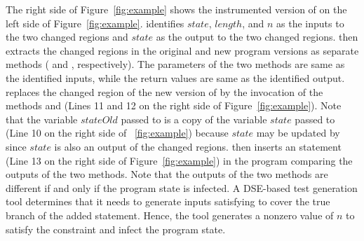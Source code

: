The right side of Figure~\ref{fig:example} shows the instrumented version of  on the left side of 
Figure~\ref{fig:example}. 
 identifies $state$, $length$, and $n$ as the inputs to the two changed regions
and $state$ as the output to the two changed regions.
 then extracts the
changed regions in the original and new program versions as separate methods 
( and , respectively).
The parameters of the two methods are same as the identified inputs, while the return values 
are same as the identified output.
 replaces the changed region of the new version of
 by the invocation of the methods  and  
(Lines 11 and 12 on the right side of Figure~\ref{fig:example}). 
Note that the variable $stateOld$ passed to 
 is a copy of the variable $state$ passed to  (Line 10 on the right side of ~\ref{fig:example}) because 
$state$ may be updated by  since $state$ is also an output of the changed regions. 
 then inserts an  statement (Line 13 on the right side of Figure~\ref{fig:example})
in the program comparing the outputs of the two methods.
Note that the outputs of the two methods are different if and only if the program state is infected.
A DSE-based test generation tool determines that it needs to generate inputs 
satisfying  to cover the true branch of the added  statement. 
Hence, the tool generates a nonzero value of $n$ to satisfy the constraint and infect the program state. 
